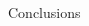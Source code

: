 \documentclass[final,t,overlay, xcolor=table, sans, mathserif]{beamer}
\begin{document}
\begin{frame}{}
\begin{columns}[t]
\begin{column}{.65\linewidth}
\begin{block}{Conclusions}
\end{block}




\end{column}
\end{columns}


\end{frame}
\end{document}
